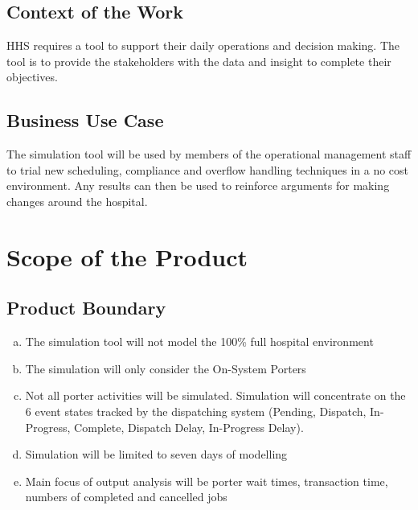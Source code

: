 \documentclass[paper=letter, fontsize=10pt]{scrartcl}
\numberwithin{equation}{section}		%
\numberwithin{figure}{section}			%
\numberwithin{table}{section}				%
\begin{document}
\subsection{Context of the Work}
HHS requires a tool to support their daily operations and decision making. The tool is to provide the stakeholders with the data and insight to complete their objectives.
\subsection{Business Use Case}
The simulation tool will be used by members of the operational management staff to trial new scheduling, compliance and overflow handling techniques in a no cost environment. Any results can then be used to reinforce arguments for making changes around the hospital.

\section{Scope of the Product}
\subsection{Product Boundary}
\begin{enumerate}[(a)]
	\item The simulation tool will not model the 100\% full hospital environment
	\item The simulation will only consider the On-System Porters
	\item Not all porter activities will be simulated. Simulation will concentrate on the 6 event states tracked by the dispatching system (Pending, Dispatch, In-Progress, Complete, Dispatch Delay, In-Progress Delay).
	\item Simulation will be limited to seven days of modelling
	\item Main focus of output analysis will be porter wait times, transaction time, numbers of completed and cancelled jobs
\end{enumerate} 
\end{document}
